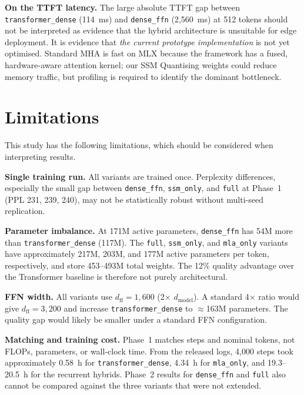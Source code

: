\documentclass[conference]{IEEEtran}
\begin{document}
\textbf{On the TTFT latency.} The large absolute TTFT gap between
\texttt{transformer\_dense} (114~ms) and \texttt{dense\_ffn} (2{,}560~ms) at
512 tokens should not be interpreted as evidence that the hybrid architecture
is unsuitable for edge deployment. It is evidence that \emph{the current
prototype implementation} is not yet optimised. Standard MHA is fast on MLX
because the framework has a fused, hardware-aware attention kernel; our SSM
Quantising weights could reduce memory traffic, but profiling is required to
identify the dominant bottleneck.


\section{Limitations}

This study has the following limitations, which should be considered when
interpreting results.

\textbf{Single training run.} All variants are trained once. Perplexity
differences, especially the small gap between \texttt{dense\_ffn},
\texttt{ssm\_only}, and \texttt{full} at Phase~1 (PPL 231, 239, 240), may not
be statistically robust without multi-seed replication.

\textbf{Parameter imbalance.} At 171M active parameters,
\texttt{dense\_ffn} has 54M more than \texttt{transformer\_dense} (117M).
The \texttt{full}, \texttt{ssm\_only}, and \texttt{mla\_only} variants have
approximately 217M, 203M, and 177M active parameters per token, respectively,
and store 453--493M total weights. The 12\% quality advantage over the
Transformer baseline is therefore not purely architectural.

\textbf{FFN width.} All variants use $d_\text{ff}=1{,}600$ (2$\times$
$d_\text{model}$). A standard 4$\times$ ratio would give $d_\text{ff}=3{,}200$
and increase \texttt{transformer\_dense} to $\approx$163M parameters. The
quality gap would likely be smaller under a standard FFN configuration.

\textbf{Matching and training cost.} Phase~1 matches steps and nominal tokens,
not FLOPs, parameters, or wall-clock time. From the released logs, 4{,}000
steps took approximately 0.58~h for \texttt{transformer\_dense}, 4.34~h for
\texttt{mla\_only}, and 19.3--20.5~h for the recurrent hybrids. Phase~2 results
for \texttt{dense\_ffn} and \texttt{full} also cannot be compared against the
three variants that were not extended.
\end{document}
